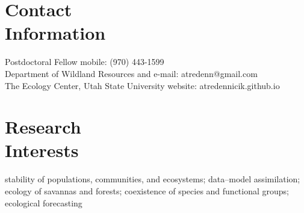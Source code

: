 \documentclass[margin,line]{resume}
\begin{document}
\begin{resume}

    \section{\mysidestyle Contact\\Information}

    Postdoctoral Fellow      							 \hfill mobile: (970) 443-1599            \vspace{0mm}\\\vspace{0mm}%
    Department of Wildland Resources and    		          \hfill e-mail: atredenn@gmail.com    \vspace{0mm}\\\vspace{0mm}%
    The Ecology Center, Utah State University      	          \hfill website: atredennicik.github.io  \vspace{0mm}\\\vspace{-4.5mm}%

    \section{\mysidestyle Research\\Interests}
		stability of populations, communities, and ecosystems; data--model assimilation; ecology of savannas and forests; coexistence of species and functional groups; ecological forecasting %

\end{resume}
\end{document}
